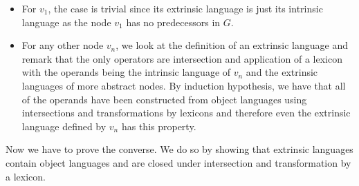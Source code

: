 \begin{itemize}
\item For $v_1$, the case is trivial since its extrinsic language is
  just its intrinsic language as the node $v_1$ has no predecessors in
  $G$.
\item For any other node $v_n$, we look at the definition of an
  extrinsic language and remark that the only operators are intersection
  and application of a lexicon with the operands being the intrinsic
  language of $v_n$ and the extrinsic languages of more abstract
  nodes. By induction hypothesis, we have that all of the operands have
  been constructed from object languages using intersections and
  transformations by lexicons and therefore even the extrinsic language
  defined by $v_n$ has this property.
\end{itemize}


Now we have to prove the converse. We do so by showing that extrinsic
languages contain object languages and are closed under intersection and
transformation by a lexicon.


